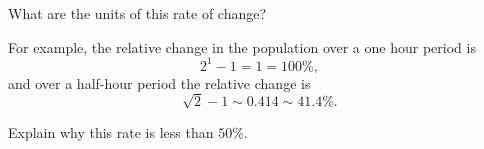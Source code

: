\documentclass{ximera}
\begin{document}
\begin{question} \label{QODFERerre}
What are the units of this rate of change?
\begin{freeResponse}
\end{freeResponse}
\end{question}

For example, the relative change in the population over a one hour period is
\[ 
        2^1 - 1 = 1 = 100\%,
\]
and over a half-hour period the relative change is
\[
    \sqrt{2} - 1 \sim 0.414 \sim 41.4\%.
\]

\begin{question} \label{QERdftrre}
Explain why this rate is less than $50\%$.
\begin{freeResponse}
\end{freeResponse}
\end{question}
\end{document}
